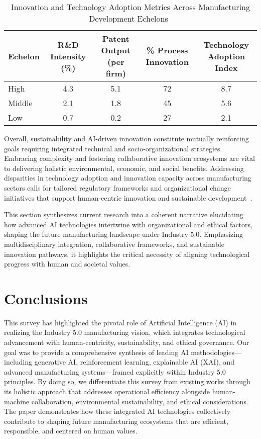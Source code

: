 \documentclass[sigconf]{acmart}
\begin{document}
\begin{table*}[htbp]
\centering
\caption{Innovation and Technology Adoption Metrics Across Manufacturing Development Echelons~\cite{ref21}}
\label{tab:innovation_metrics}
\begin{adjustbox}{max width=\textwidth}
\begin{tabular}{@{}lcccc@{}}
\toprule
Echelon & R\&D Intensity (\%) & Patent Output (per firm) & \% Process Innovation & Technology Adoption Index \\ \midrule
High & 4.3 & 5.1 & 72 & 8.7 \\
Middle & 2.1 & 1.8 & 45 & 5.6 \\
Low & 0.7 & 0.2 & 27 & 2.1 \\ \bottomrule
\end{tabular}
\end{adjustbox}
\end{table*}

Overall, sustainability and AI-driven innovation constitute mutually reinforcing goals requiring integrated technical and socio-organizational strategies. Embracing complexity and fostering collaborative innovation ecosystems are vital to delivering holistic environmental, economic, and social benefits. Addressing disparities in technology adoption and innovation capacity across manufacturing sectors calls for tailored regulatory frameworks and organizational change initiatives that support human-centric innovation and sustainable development~\cite{ref21}.

This section synthesizes current research into a coherent narrative elucidating how advanced AI technologies intertwine with organizational and ethical factors, shaping the future manufacturing landscape under Industry 5.0. Emphasizing multidisciplinary integration, collaborative frameworks, and sustainable innovation pathways, it highlights the critical necessity of aligning technological progress with human and societal values.

\section{Conclusions}

This survey has highlighted the pivotal role of Artificial Intelligence (AI) in realizing the Industry 5.0 manufacturing vision, which integrates technological advancement with human-centricity, sustainability, and ethical governance. Our goal was to provide a comprehensive synthesis of leading AI methodologies—including generative AI, reinforcement learning, explainable AI (XAI), and advanced manufacturing systems—framed explicitly within Industry 5.0 principles. By doing so, we differentiate this survey from existing works through its holistic approach that addresses operational efficiency alongside human-machine collaboration, environmental sustainability, and ethical considerations. The paper demonstrates how these integrated AI technologies collectively contribute to shaping future manufacturing ecosystems that are efficient, responsible, and centered on human values.
\end{document}
